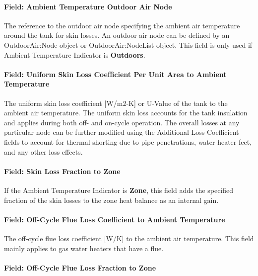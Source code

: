 \paragraph{Field: Ambient Temperature Outdoor Air Node}\label{field-ambient-temperature-outdoor-air-node}

The reference to the outdoor air node specifying the ambient air temperature around the tank for skin losses. An outdoor air node can be defined by an OutdoorAir:Node object or OutdoorAir:NodeList object. This field is only used if Ambient Temperature Indicator is \textbf{Outdoors}.

\paragraph{Field: Uniform Skin Loss Coefficient Per Unit Area to Ambient Temperature}\label{field-uniform-skin-loss-coefficient-per-unit-area-to-ambient-temperature-000}

The uniform skin loss coefficient {[}W/m2-K{]} or U-Value of the tank to the ambient air temperature. The uniform skin loss accounts for the tank insulation and applies during both off- and on-cycle operation. The overall losses at any particular node can be further modified using the Additional Loss Coefficient fields to account for thermal shorting due to pipe penetrations, water heater feet, and any other loss effects.

\paragraph{Field: Skin Loss Fraction to Zone}\label{field-skin-loss-fraction-to-zone}

If the Ambient Temperature Indicator is \textbf{Zone}, this field adds the specified fraction of the skin losses to the zone heat balance as an internal gain.

\paragraph{Field: Off-Cycle Flue Loss Coefficient to Ambient Temperature}\label{field-off-cycle-flue-loss-coefficient-to-ambient-temperature}

The off-cycle flue loss coefficient {[}W/K{]} to the ambient air temperature. This field mainly applies to gas water heaters that have a flue.

\paragraph{Field: Off-Cycle Flue Loss Fraction to Zone}\label{field-off-cycle-flue-loss-fraction-to-zone}

